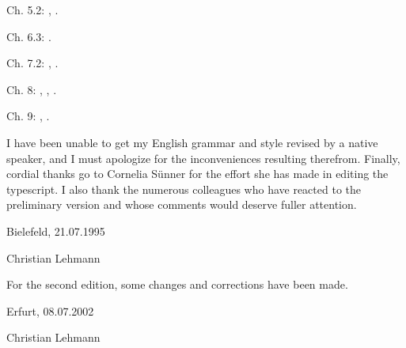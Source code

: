 \begin{refsection}
Ch. 5.2:  \citeyear{Lehmann1989a}, \citeyear{Lehmann2002}.

Ch. 6.3:  \citeyear{Lehmann1989b}.

Ch. 7.2:  \citeyear{Lehmann1985b}, \citeyear{Lehmann1986}.

Ch. 8:    \citeyear{Lehmann1985a}, \citeyear{Lehmann1987}, \citeyear{Lehmann1992}.

Ch. 9:    \citeyear{Lehmann1993}, \citeyear{Lehmann1995}.

I have been unable to get my English grammar and style revised by a native speaker, and I must apologize for the inconveniences resulting therefrom. Finally, cordial thanks go to Cornelia Sünner for the effort she has made in editing the typescript. I also thank the numerous colleagues who have reacted to the preliminary version and whose comments would deserve fuller attention.

\vspace{\baselineskip}

\begin{minipage}{.45\linewidth}
	\begin{flushleft}
		Bielefeld, 21.07.1995
	\end{flushleft}
\end{minipage}
\begin{minipage}{.45\linewidth}
	\begin{flushright}
		Christian Lehmann
	\end{flushright}
\end{minipage}

\vspace{\baselineskip}

\noindent For the second edition, some changes and corrections have been made.

\vspace{\baselineskip}

\begin{minipage}{.45\linewidth}
	\begin{flushleft}
		Erfurt, 08.07.2002
	\end{flushleft}
\end{minipage}
\begin{minipage}{.45\linewidth}
	\begin{flushright}
		Christian Lehmann
	\end{flushright}
\end{minipage}

\printbibliography[heading=subbibliography]
\end{refsection}

